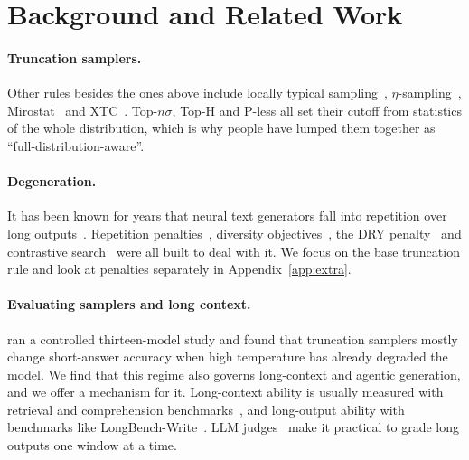 \documentclass{article}
\begin{document}
\section{Background and Related Work}
\label{sec:related}

\paragraph{Truncation samplers.}
Other rules besides the ones above include locally typical sampling~\citep{meister2023locally}, $\eta$-sampling~\citep{hewitt2022truncation}, Mirostat~\citep{basu2021mirostat} and XTC~\citep{weidmann2024xtc,weidmann2026xtc}. Top-$n\sigma$, Top-H and P-less all set their cutoff from statistics of the whole distribution, which is why people have lumped them together as ``full-distribution-aware''.

\paragraph{Degeneration.}
It has been known for years that neural text generators fall into repetition over long outputs~\citep{holtzman2020curious,welleck2020neural,fu2021theoretical}. Repetition penalties~\citep{keskar2019ctrl}, diversity objectives~\citep{li2016diversity}, the DRY penalty~\citep{weidmann2024dry,weidmann2026dry} and contrastive search~\citep{su2022contrastive,su2023contrastive} were all built to deal with it. We focus on the base truncation rule and look at penalties separately in Appendix~\ref{app:extra}.

\paragraph{Evaluating samplers and long context.}
\citet{larosa2026fragility} ran a controlled thirteen-model study and found that truncation samplers mostly change short-answer accuracy when high temperature has already degraded the model. We find that this regime also governs long-context and agentic generation, and we offer a mechanism for it. Long-context ability is usually measured with retrieval and comprehension benchmarks~\citep{bai2024longbench,hsieh2024ruler,shaham2023zeroscrolls}, and long-output ability with benchmarks like LongBench-Write~\citep{bai2025longwriter}. LLM judges~\citep{zheng2023judging,li2024generative} make it practical to grade long outputs one window at a time.
\end{document}
